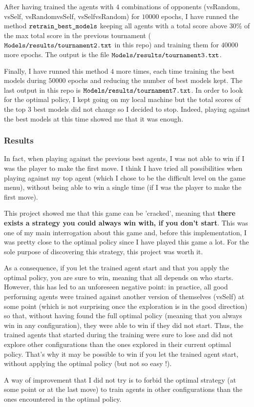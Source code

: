 \documentclass{article}
\begin{document}
After having trained the agents with $4$ combinations of opponents (vsRandom, vsSelf, vsRandomvsSelf, vsSelfvsRandom) for $10000$ epochs, I have runned the method $\verb|retrain_best_models|$ keeping all agents with a total score above $30$\% of the max total score in the previous tournament ($\verb|Models/results/tournament2.txt|$ in this repo) and training them for $40000$ more epochs. The output is the file $\verb|Models/results/tournament3.txt|$. 

Finally, I have runned this method $4$ more times, each time training the best models during $50000$ epochs and reducing the number of best models kept. The last output in this repo is $\verb|Models/results/tournament7.txt|$. In order to look for the optimal policy, I kept going on my local machine but the total scores of the top $3$ best models did not change so I decided to stop. Indeed, playing against the best models at this time showed me that it was enough.

\subsubsection*{Results}

In fact, when playing against the previous best agents, I was not able to win if I was the player to make the first move. I think I have tried all possibilities when playing against my top agent (which I chose to be the difficult level on the game menu), without being able to win a single time (if I was the player to make the first move).

This project showed me that this game can be 'cracked', meaning that \textbf{there exists a strategy you could always win with, if you don't start}. This was one of my main interrogation about this game and, before this implementation, I was pretty close to the optimal policy since I have played this game a lot. For the sole purpose of discovering this strategy, this project was worth it.

As a consequence, if you let the trained agent start and that you apply the optimal policy, you are sure to win, meaning that all depends on who starts. However, this has led to an unforeseen negative point: in practice, all good performing agents were trained against another version of themselves (vsSelf) at some point (which is not surprising once the exploration is in the good direction) so that, without having found the full optimal policy (meaning that you always win in any configuration), they were able to win if they did not start. Thus, the trained agents that started during the training were sure to lose and did not explore other configurations than the ones explored in their current optimal policy. That's why it may be possible to win if you let the trained agent start, without applying the optimal policy (but not so easy !).

A way of improvement that I did not try is to forbid the optimal strategy (at some point or at the last move) to train agents in other configurations than the ones encountered in the optimal policy.
\end{document}
